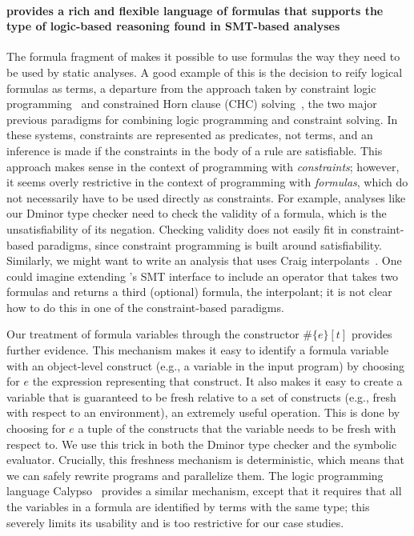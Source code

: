 \documentclass[acmsmall,screen,nonacm]{acmart}
\theoremstyle{definition}
\begin{document}
\paragraph{\Name provides a rich and flexible language of formulas that supports
the type of logic-based reasoning found in SMT-based analyses}
The formula fragment of \Name makes it possible to use formulas the way they
need to be used by static analyses.
A good example of this is the decision to reify logical formulas as terms, a
departure from the approach taken by constraint logic
programming~\citep{clp,clpsurvey} and constrained Horn clause (CHC)
solving~\citep{hfc,gurfinkel2015seahorn,hoder2012generalized,bjorner2015horn},
the two major previous paradigms for combining logic programming and constraint
solving.
In these systems, constraints are represented as predicates, not terms, and an
inference is made if the constraints in the body of a rule are satisfiable.
This approach makes sense in the context of programming with {\em constraints};
however, it seems overly restrictive in the context of programming with {\em
formulas}, which do not necessarily have to be used directly as constraints.
For example, analyses like our Dminor type checker need to check the validity
of a formula, which is the unsatisfiability of its negation.
Checking validity does not easily fit in constraint-based paradigms, since
constraint programming is built around satisfiability.
Similarly, we might want to write an analysis that uses Craig
interpolants~\citep{craig}.
One could imagine extending \Name's SMT interface to include an operator
 that takes two formulas and returns a third (optional)
formula, the interpolant; it is not clear how to do this in one of the
constraint-based paradigms.

Our treatment of formula variables through the constructor $\#\{e\}[t]$
provides further evidence.
This mechanism makes it easy to identify a formula variable with an
object-level construct (e.g., a variable in the input program) by choosing for
$e$ the expression representing that construct.
It also makes it easy to create a variable that is guaranteed to be fresh
relative to a set of constructs (e.g., fresh with respect to an environment),
an extremely useful operation.
This is done by choosing for $e$ a tuple of the constructs that the
variable needs to be fresh with respect to.
We use this trick in both the Dminor type checker and the symbolic evaluator.
Crucially, this freshness mechanism is deterministic, which means that we can
safely rewrite \Name programs and parallelize them.
The logic programming language Calypso~\citep{calypso,saturn} provides a
similar mechanism, except that it requires that all the variables in a formula
are identified by terms with the same type; this severely limits its usability
and is too restrictive for our case studies.
\end{document}
